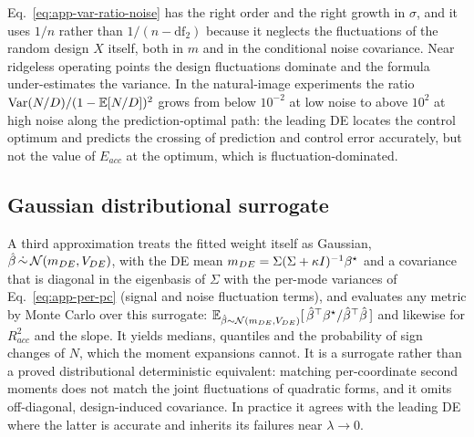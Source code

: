 {\begin{remark}
Eq.~\ref{eq:app-var-ratio-noise} has the right order and the right growth
in $\sigma$, and it uses $1/n$ rather than $1/(n-\mathrm{df}_2)$ because it
neglects the fluctuations of the random design $X$ itself, both in $m$ and
in the conditional noise covariance.  Near ridgeless operating points the
design fluctuations dominate and the formula under-estimates the variance.
In the natural-image experiments the ratio $\mathrm{Var}(N/D)/(1-\mathbb{E}[N/D])^2$ grows
from below $10^{-2}$ at low noise to above $10^2$ at high noise along the
prediction-optimal path: the leading DE locates the control optimum and
predicts the crossing of prediction and control error accurately, but not
the value of $E_{acc}$ at the optimum, which is fluctuation-dominated.
\end{remark}

\fi 
\subsection{Gaussian distributional surrogate}
\label{sec:app-ratio-gaussian}

A third approximation treats the fitted weight itself as Gaussian,
$\hat{\beta}\,\dot\sim\,\mathcal N(m_{DE},V_{DE})$, with the DE mean
$m_{DE}=\Sigma(\Sigma+\kappa I)^{-1}{\beta^{\star}}$ and a covariance that is diagonal in
the eigenbasis of $\Sigma$ with the per-mode variances of
Eq.~\ref{eq:app-per-pc} (signal and noise fluctuation terms), and evaluates
any metric by Monte Carlo over this surrogate:
$\mathbb{E}_{\hat{\beta}\sim\mathcal N(m_{DE},V_{DE})}[\,{\hat{\beta}}^\top{\beta^{\star}}/{\hat{\beta}}^\top\hat{\beta}\,]$
and likewise for $R^2_{acc}$ and the slope.  It yields medians, quantiles
and the probability of sign changes of $N$, which the moment expansions cannot. 
{It is a surrogate rather than a proved distributional deterministic equivalent: matching per-coordinate second moments does not match the joint fluctuations of quadratic forms, and it omits off-diagonal, design-induced covariance.  In practice it agrees with the leading DE where the latter is accurate and inherits its failures near $\lambda\to0$.}

}
